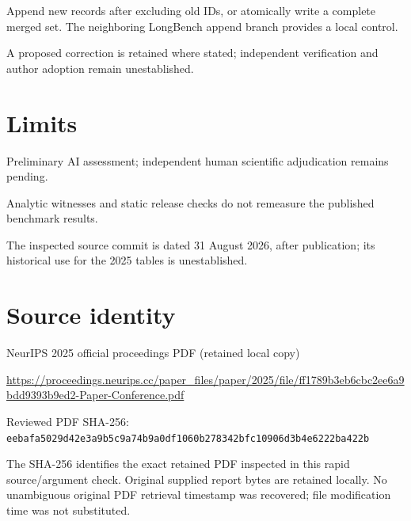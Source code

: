 \documentclass[11pt]{article}
\begin{document}
Append new records after excluding old IDs, or atomically write a complete merged set. The neighboring LongBench append branch provides a local control.

A proposed correction is retained where stated; independent verification and author adoption remain unestablished.

\section*{Limits}

Preliminary AI assessment; independent human scientific adjudication remains pending.\par

Analytic witnesses and static release checks do not remeasure the published benchmark results.\par

The inspected source commit is dated 31 August 2026, after publication; its historical use for the 2025 tables is unestablished.\par

\section*{Source identity}

NeurIPS 2025 official proceedings PDF (retained local copy)

\url{https://proceedings.neurips.cc/paper_files/paper/2025/file/ff1789b3eb6cbc2ee6a9bdd9393b9ed2-Paper-Conference.pdf}

Reviewed PDF SHA-256: \nolinkurl{eebafa5029d42e3a9b5c9a74b9a0df1060b278342bfc10906d3b4e6222ba422b}

The SHA-256 identifies the exact retained PDF inspected in this rapid source/argument check. Original supplied report bytes are retained locally. No unambiguous original PDF retrieval timestamp was recovered; file modification time was not substituted.
\end{document}
